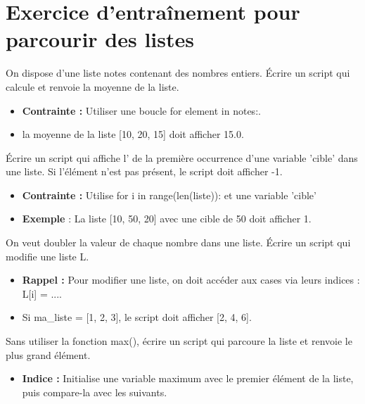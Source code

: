 \chapter*{Exercice d'entraînement pour parcourir des listes}

\begin{Exercise}[title = {Le grand classique - Parcours par valeur}]
On dispose d'une liste notes contenant des nombres entiers. Écrire un script qui calcule et renvoie la moyenne de la liste.
\begin{itemize}
    \item \textbf{Contrainte :} Utiliser une boucle for element in notes:.
    \item la moyenne de la liste [10, 20, 15] doit afficher 15.0.
\end{itemize}

\end{Exercise}

\begin{Exercise}[title = {Recherche d'indice (Parcours par index)}]
    Écrire un script qui affiche l' de la première occurrence d'une variable 'cible' dans une liste. Si l'élément n'est pas présent, le script doit afficher -1.
    \begin{itemize}
        \item \textbf{Contrainte :} Utilise for i in range(len(liste)): et une variable 'cible'
        \item \textbf{Exemple} : La liste [10, 50, 20] avec une cible de 50 doit afficher 1.
    \end{itemize}

\end{Exercise}

 \begin{Exercise}[title = {Transformation (Parcours par index)}]
     On veut doubler la valeur de chaque nombre dans une liste. Écrire un script  qui modifie une liste L.
     \begin{itemize}
         \item \textbf{Rappel :} Pour modifier une liste, on doit accéder aux cases via leurs indices : L[i] = ....
        \item Si ma\_liste = [1, 2, 3], le script doit afficher [2, 4, 6].
     \end{itemize}
 \end{Exercise}

\begin{Exercise}[title={Le maximum (Parcours par valeur)}]
    Sans utiliser la fonction max(), écrire un script qui parcoure la liste et renvoie le plus grand élément.
    \begin{itemize}
        \item \textbf{Indice :} Initialise une variable maximum avec le premier élément de la liste, puis compare-la avec les suivants.
    \end{itemize} 
\end{Exercise}

